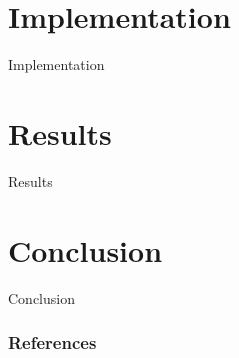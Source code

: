 \documentclass[aspectratio=169]{beamer}
\begin{document}
  \section{Implementation} %
  \label{sec:implementation}
    \begin{frame}{Implementation}

    \end{frame}

  \section{Results} %
  \label{sec:results}
    \begin{frame}{Results}

    \end{frame}

  \section{Conclusion} %
  \label{sec:conclusion}
    \begin{frame}{Conclusion}

    \end{frame}

  \begin{frame}
    \frametitle{References}
    \tiny
    \begin{multicols}{2}
      \nocite{*}
      
    \end{multicols}
  \end{frame}
\end{document}
